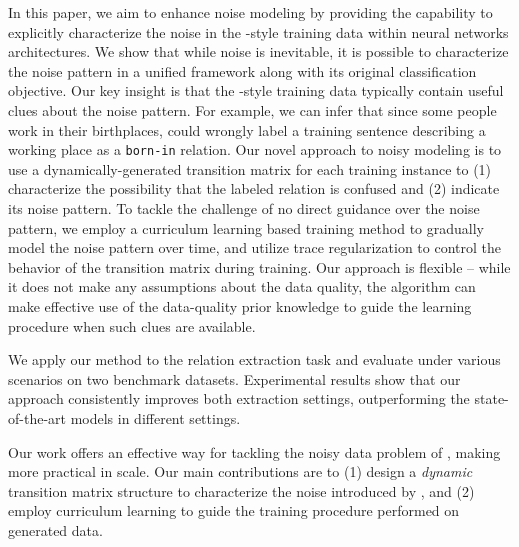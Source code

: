 In this paper, we aim to enhance \DS noise modeling by providing the capability to explicitly characterize 
the noise in the \DS-style training data within neural networks architectures.  We show that while noise is inevitable, it is possible to characterize the noise pattern  in a unified framework along with its original classification objective. Our key insight is that the \DS-style training  data typically contain useful clues about the noise pattern. For example, we can infer that since some people work in their birthplaces, \DS could wrongly label a training sentence describing a working place as a \texttt{born-in} relation.
Our novel approach to noisy modeling is to use a dynamically-generated transition matrix for each training instance to (1) characterize the possibility that the \DS labeled relation is confused and (2) indicate its noise pattern.  To tackle the challenge of no direct guidance over the noise pattern, we employ a curriculum learning based training method to gradually model the noise pattern over time, and utilize trace regularization to control the behavior of the transition matrix during training. Our approach is flexible -- while it does not make any assumptions about the data quality, the algorithm can make effective use
of the data-quality prior knowledge to guide the learning procedure when such clues are available. 

We apply our method to the relation extraction task and evaluate under various scenarios on two benchmark datasets. Experimental results show that our approach consistently improves both extraction settings, outperforming the state-of-the-art models in different settings. 

Our work offers an effective way for tackling the noisy data problem of \DS, making \DS more practical in scale. Our main contributions are to (1) design a \emph{dynamic} transition matrix structure to characterize the noise introduced by \DS, and (2) employ curriculum learning to guide the training procedure performed on \DS generated data.



